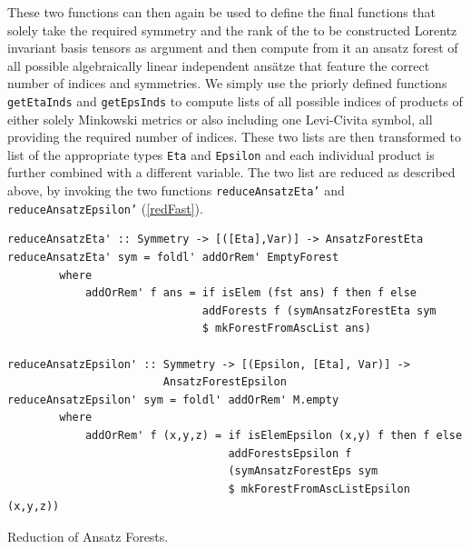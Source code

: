 \documentclass[a4paper,12pt, DIV=14, BCOR=5mm, twoside, headsepline, numbers=noenddot]{scrbook}
\begin{document}
These two functions can then again be used to define the final functions that solely take the required symmetry and the rank of the to be constructed Lorentz invariant basis tensors as argument and then compute from it an ansatz forest of all possible algebraically linear independent ansätze that feature the correct number of indices and symmetries. We simply use the priorly defined functions \texttt{getEtaInds} and \texttt{getEpsInds} to compute lists of all possible indices of products of either solely Minkowski metrics or also including one Levi-Civita symbol, all providing the required number of indices. These two lists are then transformed to list of the appropriate types \texttt{Eta} and \texttt{Epsilon} and each individual product is further combined with a different variable. The two list are reduced as described above, by invoking the two functions \texttt{reduceAnsatzEta'} and \texttt{reduceAnsatzEpsilon'} (\ref{redFast}). 
\begin{listing}[hbt!]
\begin{verbatim}
reduceAnsatzEta' :: Symmetry -> [([Eta],Var)] -> AnsatzForestEta
reduceAnsatzEta' sym = foldl' addOrRem' EmptyForest
        where
            addOrRem' f ans = if isElem (fst ans) f then f else
                              addForests f (symAnsatzForestEta sym 
                              $ mkForestFromAscList ans)

reduceAnsatzEpsilon' :: Symmetry -> [(Epsilon, [Eta], Var)] ->
                        AnsatzForestEpsilon
reduceAnsatzEpsilon' sym = foldl' addOrRem' M.empty
        where
            addOrRem' f (x,y,z) = if isElemEpsilon (x,y) f then f else
                                  addForestsEpsilon f 
                                  (symAnsatzForestEps sym 
                                  $ mkForestFromAscListEpsilon (x,y,z))  
\end{verbatim} 
\caption{Reduction of Ansatz Forests.}\label{redFast}
\end{listing}

\end{document}
